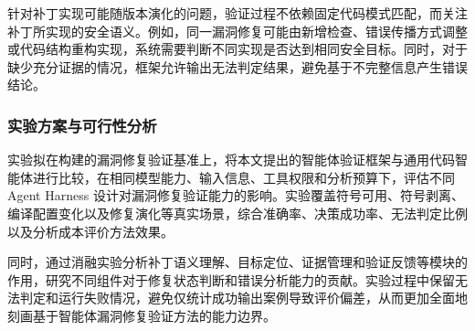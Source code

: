 针对补丁实现可能随版本演化的问题，验证过程不依赖固定代码模式匹配，而关注补丁所实现的安全语义。例如，同一漏洞修复可能由新增检查、错误传播方式调整或代码结构重构实现，系统需要判断不同实现是否达到相同安全目标。同时，对于缺少充分证据的情况，框架允许输出无法判定结果，避免基于不完整信息产生错误结论。

\subsubsection{实验方案与可行性分析}
\label{sec:verification-evaluation}

实验拟在构建的漏洞修复验证基准上，将本文提出的智能体验证框架与通用代码智能体进行比较，在相同模型能力、输入信息、工具权限和分析预算下，评估不同 Agent Harness 设计对漏洞修复验证能力的影响。实验覆盖符号可用、符号剥离、编译配置变化以及修复演化等真实场景，综合准确率、决策成功率、无法判定比例以及分析成本评价方法效果。

同时，通过消融实验分析补丁语义理解、目标定位、证据管理和验证反馈等模块的作用，研究不同组件对于修复状态判断和错误分析能力的贡献。实验过程中保留无法判定和运行失败情况，避免仅统计成功输出案例导致评价偏差，从而更加全面地刻画基于智能体漏洞修复验证方法的能力边界。